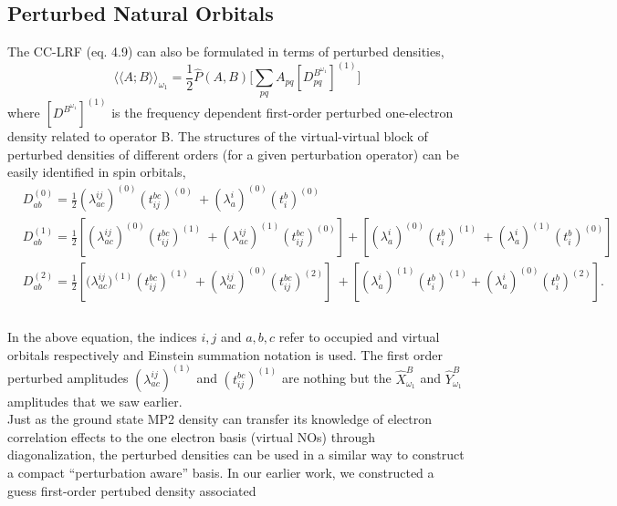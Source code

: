 \subsection{Perturbed Natural Orbitals}
The CC-LRF (eq. 4.9) can also be formulated in terms of perturbed densities,
\begin{equation}
{\langle\langle A;B\rangle\rangle}_{\omega_1} =  \frac{1}{2}\hat{P}(A,B)\big[\sum_{pq} A_{pq}[{D^{B^{\omega_1}}_{pq}}]^{(1)}\big]
\end{equation}
where $[{D^{B^{\omega_1}}}]^{(1)}$ is the frequency dependent first-order
perturbed one-electron density related to operator B. The structures  
of the virtual-virtual block of perturbed densities of different orders
(for a given perturbation operator) can be easily identified in spin orbitals,
\\
\begin{equation}
\begin{split}
& D^{(0)}_{ab} = \frac{1}{2}(\lambda^{ij}_{ac})^{(0)}(t^{bc}_{ij})^{(0)} \
+ (\lambda^{i}_{a})^{(0)}(t^{b}_{i})^{(0)} \\
&D^{(1)}_{ab} = \frac{1}{2}[(\lambda^{ij}_{ac})^{(0)}(t^{bc}_{ij})^{(1)} \
+ (\lambda^{ij}_{ac})^{(1)}(t^{bc}_{ij})^{(0)}] + [(\lambda^{i}_{a})^{(0)}(t^{b}_{i})^{(1)}\
 + (\lambda^{i}_{a})^{(1)}(t^{b}_{i})^{(0)}] \\
&D^{(2)}_{ab} = \frac{1}{2}[{(\lambda^{ij}_{ac}})^{(1)}(t^{bc}_{ij})^{(1)}\
 + (\lambda^{ij}_{ac})^{(0)}(t^{bc}_{ij})^{(2)}]\ 
+ [(\lambda^{i}_{a})^{(1)} (t^{b}_{i})^{(1)} + (\lambda^{i}_{a})^{(0)}(t^{b}_{i})^{(2)}].\\
\end{split}
\end{equation}
\\
In the above equation, the indices $i,j$ and $a,b,c$ refer to occupied and virtual orbitals respectively
and Einstein summation notation is used. The first order perturbed amplitudes $(\lambda^{ij}_{ac})^{(1)}$ 
and $(t^{bc}_{ij})^{(1)}$ are nothing but the $\hat{X}^{B}_{\omega_1}$ and $\hat{Y}^{B}_{\omega_1}$ 
amplitudes that we saw earlier.\\ Just as the ground state MP2 density can transfer its knowledge of 
electron correlation effects to the one electron basis (virtual NOs) through diagonalization, 
the perturbed densities can be used in a similar way to construct a compact ``perturbation aware''
basis. In our earlier work, we constructed a guess first-order pertubed density associated  
